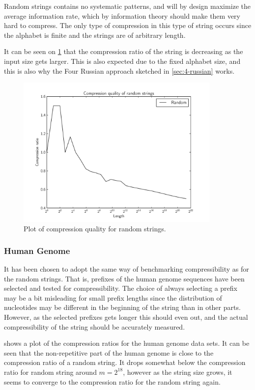 \documentclass[twoside,11pt,openright]{report}
\begin{document}
Random strings contains no systematic patterns, and will by design maximize the average information rate, which by information theory should make them very hard to compress. The only type of compression in this type of string occurs since the alphabet is finite and the strings are of arbitrary length.

It can be seen on \cref{fig:compression:quality:random} that the compression ratio of the string is decreasing as the input size gets larger. This is also expected due to the fixed alphabet size, and this is also why the Four Russian approach sketched in \cref{sec:4-russian} works.
%
\begin{figure}[h!]
  \centering
  \includegraphics[width=10cm]{compression/random}
  \caption{Plot of compression quality for random strings.}
  \label{fig:compression:quality:random}
\end{figure}

\subsubsection{Human Genome}
It has been chosen to adopt the same way of benchmarking compressibility as for the random strings. That is, prefixes of the human genome sequences have been selected and tested for compressibility. The choice of always selecting a prefix may be a bit misleading for small prefix lengths since the distribution of nucleotides may be different in the beginning of the string than in other parts. However, as the selected prefixes gets longer this should even out, and the actual compressibility of the string should be accurately measured.

 shows a plot of the compression ratios for the human genome data sets. It can be seen that the non-repetitive part of the human genome is close to the compression ratio of a random string. It drops somewhat below the compression ratio for random string around $m = 2^{18}$, however as the string size grows, it seems to converge to the compression ratio for the random string again.
\end{document}

